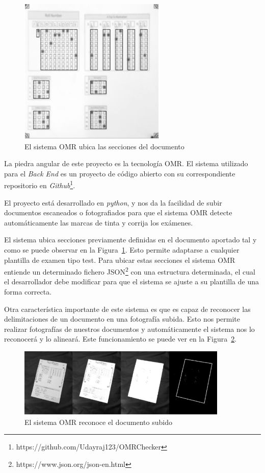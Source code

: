 \documentclass[a4paper, 12pt]{book}
\begin{document}
\begin{figure}
  \centering
  \includegraphics[width=7cm, keepaspectratio]{img/omr_1}
  \caption{El sistema OMR ubica las secciones del documento}
  \label{figura:uso_template_omr}
\end{figure}

La piedra angular de este proyecto es la tecnología OMR. El sistema utilizado
para el \textit{Back End} es un proyecto de código abierto con su correspondiente repositorio en
\textit{\textit{Github}}\footnote{https://github.com/Udayraj123/OMRChecker}.

El proyecto está desarrollado en \textit{python}, y nos da la facilidad de subir
documentos escaneados o fotografiados para que el sistema OMR detecte
automáticamente las marcas de tinta y corrija los exámenes.

El sistema ubica secciones previamente definidas en el documento aportado
tal y como se puede observar en la Figura~\ref{figura:uso_template_omr}.
Esto permite adaptarse a cualquier plantilla de examen tipo test.
Para ubicar estas secciones el sistema OMR entiende un determinado fichero
JSON\footnote{https://www.json.org/json-en.html} con una estructura
determinada, el cual el desarrollador debe modificar para que el sistema
se ajuste a su plantilla de una forma correcta.

Otra característica importante de este sistema es que es capaz de reconocer
las delimitaciones de un documento en una fotografía subida. Esto nos permite
realizar fotografías de nuestros documentos y automáticamente el sistema
nos lo reconocerá y lo alineará. Este funcionamiento se puede ver en la
Figura~\ref{figura:reconocimiento_doc_omr}.

\begin{figure}
  \centering
  \includegraphics[width=10cm, keepaspectratio]{img/omr_2}
  \caption{El sistema OMR reconoce el documento subido}
  \label{figura:reconocimiento_doc_omr}
\end{figure}
\end{document}
